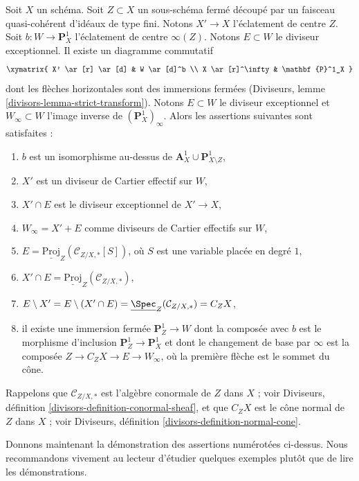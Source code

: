 \noindent
Soit $X$ un schéma. Soit $Z \subset X$ un sous-schéma fermé découpé
par un faisceau quasi-cohérent d'idéaux de type fini. Notons $X' \to X$
l'éclatement de centre $Z$. Soit $b : W \to \mathbf{P}^1_X$
l'éclatement de centre $\infty(Z)$. Notons $E \subset W$ le diviseur
exceptionnel. Il existe un diagramme commutatif
$$
\xymatrix{
X' \ar[r] \ar[d] & W \ar[d]^b \\
X \ar[r]^\infty & \mathbf{P}^1_X
}
$$
dont les flèches horizontales sont des immersions fermées
(Diviseurs, lemme \ref{divisors-lemma-strict-transform}). Notons $E \subset W$
le diviseur exceptionnel et $W_\infty \subset W$ l'image inverse
de $(\mathbf{P}^1_X)_\infty$. Alors les assertions suivantes sont satisfaites :
\begin{enumerate}
\item $b$ est un isomorphisme au-dessus de
$\mathbf{A}^1_X \cup \mathbf{P}^1_{X \setminus Z}$,
\item $X'$ est un diviseur de Cartier effectif sur $W$,
\item $X' \cap E$ est le diviseur exceptionnel de $X' \to X$,
\item $W_\infty = X' + E$ comme diviseurs de Cartier effectifs sur $W$,
\item $E = \underline{\text{Proj}}_Z(\mathcal{C}_{Z/X, *}[S])$, où $S$
est une variable placée en degré $1$,
\item $X' \cap E = \underline{\text{Proj}}_Z(\mathcal{C}_{Z/X, *})$,
\item
\label{item-cone-is-open}
$E \setminus X' = E \setminus (X' \cap E) =
\underline{\Spec}_Z(\mathcal{C}_{Z/X, *}) = C_ZX$,
\item
\label{item-find-Z-in-blowup}
il existe une immersion fermée $\mathbf{P}^1_Z \to W$ dont la
composée avec $b$ est le morphisme d'inclusion
$\mathbf{P}^1_Z \to \mathbf{P}^1_X$ et dont le changement de base par $\infty$
est la composée $Z \to C_ZX \to E \to W_\infty$, où la première
flèche est le sommet du cône.
\end{enumerate}
Rappelons que $\mathcal{C}_{Z/X, *}$ est l'algèbre conormale de $Z$ dans $X$ ;
voir Diviseurs, définition \ref{divisors-definition-conormal-sheaf}, et
que $C_ZX$ est le cône normal de $Z$ dans $X$ ; voir
Diviseurs, définition \ref{divisors-definition-normal-cone}.

\medskip\noindent
Donnons maintenant la démonstration des assertions numérotées ci-dessus. Nous recommandons
vivement au lecteur d'étudier quelques exemples plutôt que de lire les
démonstrations.

